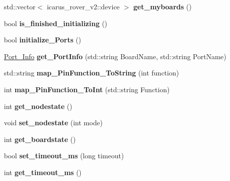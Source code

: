 \begin{DoxyCompactItemize}
std\+::vector$<$ icarus\+\_\+rover\+\_\+v2\+::device $>$ {\bfseries get\+\_\+myboards} ()
\item 
\mbox{\label{classGPIONodeProcess_a4e1fbb7606a2f5bc2cc6a8f52d775acf}} 
bool {\bfseries is\+\_\+finished\+\_\+initializing} ()
\item 
\mbox{\label{classGPIONodeProcess_aa072b0920fe36e9af5a09c204fa3b900}} 
bool {\bfseries initialize\+\_\+\+Ports} ()
\item 
\mbox{\label{classGPIONodeProcess_a18f26b9738d46c4543b4926d569cf78e}} 
\hyperlink{structPort__Info}{Port\+\_\+\+Info} {\bfseries get\+\_\+\+Port\+Info} (std\+::string Board\+Name, std\+::string Port\+Name)
\item 
\mbox{\label{classGPIONodeProcess_ae15437962971b9cd2f16a3eb4efc9b4d}} 
std\+::string {\bfseries map\+\_\+\+Pin\+Function\+\_\+\+To\+String} (int function)
\item 
\mbox{\label{classGPIONodeProcess_ae54c7bd2d8ff5cbf7ebea3ddf9b9f94c}} 
int {\bfseries map\+\_\+\+Pin\+Function\+\_\+\+To\+Int} (std\+::string Function)
\item 
\mbox{\label{classGPIONodeProcess_ad8c6d9479e92c63981149d0c9a7a1910}} 
int {\bfseries get\+\_\+nodestate} ()
\item 
\mbox{\label{classGPIONodeProcess_ac690824abd01dd5c18f7453ac15bdfe1}} 
void {\bfseries set\+\_\+nodestate} (int mode)
\item 
\mbox{\label{classGPIONodeProcess_ab2986b01cf341b492dbe145fd7f55109}} 
int {\bfseries get\+\_\+boardstate} ()
\item 
\mbox{\label{classGPIONodeProcess_ab72710aebdfecc3eb3f454b60c8afe38}} 
bool {\bfseries set\+\_\+timeout\+\_\+ms} (long timeout)
\item 
\mbox{\label{classGPIONodeProcess_a6df179ffb961a79da62c695490d4ed55}} 
int {\bfseries get\+\_\+timeout\+\_\+ms} ()
\item 

\end{DoxyCompactItemize}
